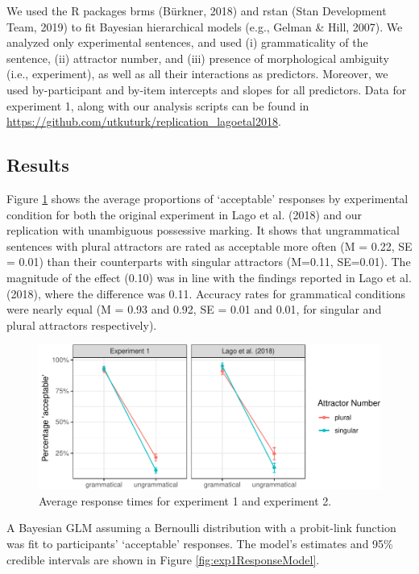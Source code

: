 \documentclass[
  english,
  doc,floatsintext]{apa6}
\begin{document}
We used the R packages brms (Bürkner, 2018) and rstan (Stan Development Team, 2019) to fit Bayesian hierarchical models (e.g., Gelman \& Hill, 2007). We analyzed only experimental sentences, and used
(i) grammaticality of the sentence,
(ii) attractor number, and
(iii) presence of morphological ambiguity (i.e., experiment), as well as all their interactions as predictors.
Moreover, we used by-participant and by-item intercepts and slopes for all predictors.
Data for experiment 1, along with our analysis scripts can be found in \url{https://github.com/utkuturk/replication_lagoetal2018}.

\hypertarget{results}{%
\subsection{Results}\label{results}}

Figure \ref{fig:exp1AvgResponse} shows the average proportions of `acceptable' responses by experimental condition for both the original experiment in Lago et al. (2018) and our replication with unambiguous possessive marking.
It shows that ungrammatical sentences with plural attractors are rated as acceptable more often
(M = 0.22,
SE = 0.01)
than their counterparts with singular attractors
(M=0.11,
SE=0.01).
The magnitude of the effect (0.10) was in line with the findings reported in Lago et al. (2018), where the difference was 0.11.
Accuracy rates for grammatical conditions were nearly equal
(M = 0.93 and 0.92, SE = 0.01 and 0.01, for singular and plural attractors respectively).

\begin{figure}
\centering
\includegraphics{ongoing_paper_files/figure-latex/exp1AvgResponse-1.pdf}
\caption{\label{fig:exp1AvgResponse}Average response times for experiment 1 and experiment 2.}
\end{figure}

A Bayesian GLM assuming a Bernoulli distribution with a probit-link function was fit to participants' `acceptable' responses. The model's estimates and 95\% credible intervals are shown in Figure \ref{fig:exp1ResponseModel}.
\end{document}
